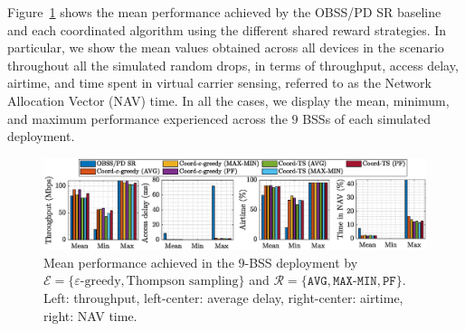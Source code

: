 Figure~\ref{fig:bar_plot_mean_performance_all} shows the mean performance achieved by the OBSS/PD SR baseline and each coordinated algorithm using the different shared reward strategies. In particular, we show the mean values obtained across all devices in the scenario throughout all the simulated random drops, in terms of throughput, access delay, airtime, and time spent in virtual carrier sensing, referred to as the Network Allocation Vector (NAV) time. In all the cases, we display the mean, minimum, and maximum performance experienced across the $9$ BSSs of each simulated deployment.

\begin{figure}[ht!]
    \centering
    \includegraphics[width=.95\linewidth]{figures/bar_plot_mean_performance_all_new.eps}
    \caption{Mean performance achieved in the $9$-BSS deployment by $\mathcal{E} = \{\varepsilon\text{-greedy}, \text{Thompson sampling}\}$ and $\mathcal{R} = \{\texttt{AVG}, \texttt{MAX-MIN}, \texttt{PF}\}$. Left: throughput, left-center: average delay, right-center: airtime, right: NAV time.}    \label{fig:bar_plot_mean_performance_all}
\end{figure}

